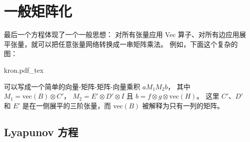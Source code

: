 
\section{一般矩阵化}

最后一个方程体现了一个一般思想：
对所有张量应用 Vec 算子、对所有边应用展平张量，就可以把任意张量网络转换成一串矩阵乘法。
例如，下面这个复杂的图：
\begin{center}
   \def\svgwidth{.7\linewidth}
   {kron.pdf_tex}
\end{center}
可以写成一个简单的向量-矩阵-矩阵-向量乘积 $a M_1 M_2 b$，
其中 $M_1 = \mathrm{vec}(B) \otimes C'$，
$M_2 = E' \otimes D' \otimes I$ 且 $b = f\otimes g\otimes \mathrm{vec}(H)$。
这里 $C'$、$D'$ 和 $E'$ 是在一侧展平的三阶张量，而 $\mathrm{vec}(B)$ 被解释为只有一列的矩阵。


\subsection{Lyapunov 方程}

